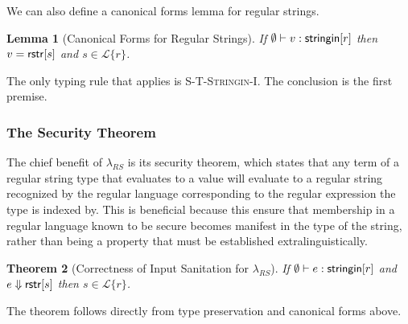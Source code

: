 \documentclass[10pt]{sigplanconf}
\newtheorem{thm}{Theorem}
\newtheorem{lem}[thm]{Lemma}
\theoremstyle{definition}
\newcommand{\Lagr}{\mathcal{L}}
\newcommand{\lang}[1]{\Lagr\{#1\}}
\newcommand{\lambdas}{\lambda_{RS}}
\newcommand{\stringin}[1]{{\sf stringin}[#1]}
\newcommand{\sreduces}{ \Downarrow }
\begin{document}
We can also define a canonical forms lemma for regular strings. 

\begin{lem}[Canonical Forms for Regular Strings]\label{thm:cfs}
  If $\emptyset \vdash v : \stringin{r}$ then $v={\sf rstr}[s]$ and $s \in \lang{r}$. 
\end{lem}
\begin{prf}
The only typing rule that applies is \textsc{S-T-Stringin-I}. The conclusion is the first premise.
\end{prf}
\subsubsection{The Security Theorem}\label{sec:securitythm}

The chief benefit of $\lambdas$ is its security theorem, which states that any term of
a regular string type that evaluates to a value will evaluate to a regular string recognized by the regular language corresponding to the regular expression the type is indexed by.
This is beneficial because this ensure that membership in a regular language known to be secure becomes manifest in the type of the string, rather than being a property that must be established extralinguistically. 

\begin{thm}[Correctness of Input Sanitation for $\lambdas$]\label{thm:scorrect}
  If  $\emptyset \vdash e : \stringin{r}$ and $e \sreduces \rstr{s}$ then $s \in \lang{r}$.
\end{thm}
\begin{prf}
  The theorem follows directly from type preservation and canonical forms above.
\end{prf}
\end{document}
